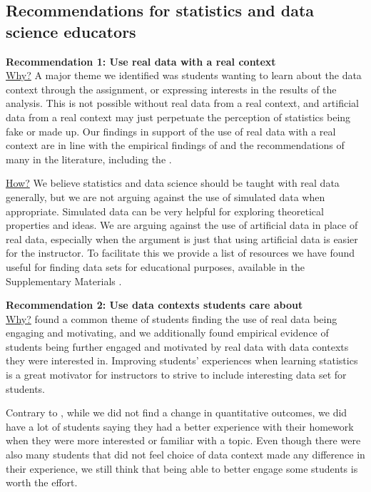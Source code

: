 \documentclass[
  12pt]{article}
\begin{document}
\subsection{Recommendations for statistics and data science
educators}\label{recommendations-for-statistics-and-data-science-educators}

\textbf{Recommendation 1: Use real data with a real context}\\
\underline{Why?} A major theme we identified was students wanting to
learn about the data context through the assignment, or expressing
interests in the results of the analysis. This is not possible without
real data from a real context, and artificial data from a real context
may just perpetuate the perception of statistics being fake or made up.
Our findings in support of the use of real data with a real context are
in line with the empirical findings of \citet{neumann2013} and the
recommendations of many in the literature, including the
\citet{gaise2016}.

\underline{How?} We believe statistics and data science should be taught
with real data generally, but we are not arguing against the use of
simulated data when appropriate. Simulated data can be very helpful for
exploring theoretical properties and ideas. We are arguing against the
use of artificial data in place of real data, especially when the
argument is just that using artificial data is easier for the
instructor. To facilitate this we provide a list of resources we have
found useful for finding data sets for educational purposes, available
in the Supplementary Materials .

\textbf{Recommendation 2: Use data contexts students care about}\\
\underline{Why?} \citet{neumann2013} found a common theme of students
finding the use of real data being engaging and motivating, and we
additionally found empirical evidence of students being further engaged
and motivated by real data with data contexts they were interested in.
Improving students' experiences when learning statistics is a great
motivator for instructors to strive to include interesting data set for
students.

Contrary to \citet{young-saver2024}, while we did not find a change in
quantitative outcomes, we did have a lot of students saying they had a
better experience with their homework when they were more interested or
familiar with a topic. Even though there were also many students that
did not feel choice of data context made any difference in their
experience, we still think that being able to better engage some
students is worth the effort.
\end{document}
